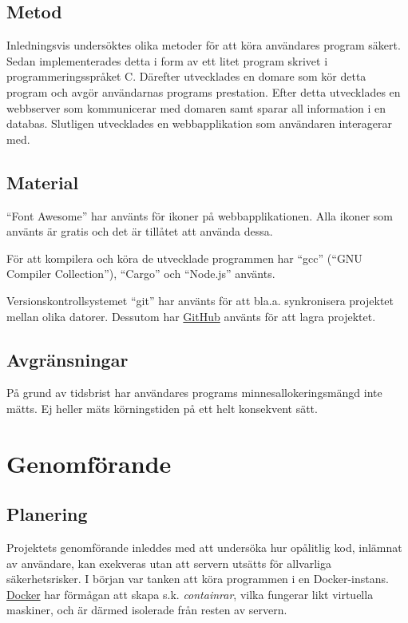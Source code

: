 \documentclass{article}
\begin{document}
\subsection{Metod}

Inledningsvis undersöktes olika metoder för att köra användares program säkert.
Sedan implementerades detta i form av ett litet program skrivet i
programmeringsspråket C. Därefter utvecklades en domare som kör detta program
och avgör användarnas programs prestation. Efter detta utvecklades en webbserver
som kommunicerar med domaren samt sparar all information i en databas. Slutligen
utvecklades en webbapplikation som användaren interagerar med.

\subsection{Material}

``Font Awesome'' har använts för ikoner på webbapplikationen. Alla ikoner som
använts är gratis och det är tillåtet att använda dessa.

För att kompilera och köra de utvecklade programmen har ``gcc'' (``GNU Compiler
Collection''), ``Cargo'' och ``Node.js'' använts.

Versionskontrollsystemet ``git'' har använts för att bla.a. synkronisera
projektet mellan olika datorer. Dessutom har \href{https://github.com/}{GitHub}
använts för att lagra projektet.

\subsection{Avgränsningar}

På grund av tidsbrist har användares programs minnesallokeringsmängd inte mätts.
Ej heller mäts körningstiden på ett helt konsekvent sätt.


\section{Genomförande}

\subsection{Planering}

Projektets genomförande inleddes med att undersöka hur opålitlig kod, inlämnat
av användare, kan exekveras utan att servern utsätts för allvarliga
säkerhetsrisker. I början var tanken att köra programmen i en Docker-instans.
\href{https://www.docker.com}{Docker} har förmågan att skapa s.k.
\textit{containrar}, vilka fungerar likt virtuella maskiner, och är därmed
isolerade från resten av servern.
\end{document}
